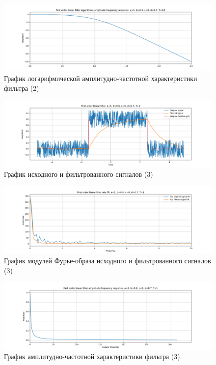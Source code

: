 \documentclass[a4paper, 12pt]{article}
\begin{document}
    \begin{figure}[H]
        \centering
        \includegraphics[scale=0.4]{2_lafr_filtered_linear.png}
        \captionsetup{skip=0pt}
        \caption{График логарифмической амплитудно-частотной характеристики фильтра (2)}
        \label{fig:filinlafr11}
    \end{figure}
    \begin{figure}[H]
        \centering
        \includegraphics[scale=0.4]{3_filtered_linear.png}
        \captionsetup{skip=0pt}
        \caption{График исходного и фильтрованного сигналов (3)}
        \label{fig:filin13}
    \end{figure}
    \begin{figure}[H]
        \centering
        \includegraphics[scale=0.4]{3_abs_filtered_linear.png}
        \captionsetup{skip=0pt}
        \caption{График модулей Фурье-образа исходного и фильтрованного сигналов (3)}
        \label{fig:filinabs13}
    \end{figure}
    \begin{figure}[H]
        \centering
        \includegraphics[scale=0.4]{3_afr_filtered_linear.png}
        \captionsetup{skip=0pt}
        \caption{График амплитудно-частотной характеристики фильтра (3)}
        \label{fig:filinafr13}
    \end{figure}
\end{document}
